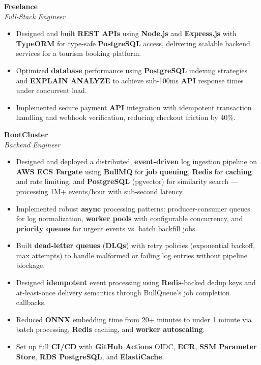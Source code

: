 \documentclass[10pt, a4paper]{article}
\begin{document}
\textbf{Freelance} \\
{\textit{\textcolor{subtle}{Full-Stack Engineer}}}\\\begin{itemize}
\item Designed and built \textbf{REST APIs} using \textbf{Node.js} and \textbf{Express.js} with \textbf{TypeORM} for type-safe \textbf{PostgreSQL} access, delivering scalable backend services for a tourism booking platform.
\item Optimized \textbf{database} performance using \textbf{PostgreSQL} indexing strategies and \textbf{EXPLAIN ANALYZE} to achieve sub-100ms \textbf{API} response times under concurrent load.
\item Implemented secure payment \textbf{API} integration with idempotent transaction handling and webhook verification, reducing checkout friction by 40\%.
\end{itemize}

\textbf{RootCluster} \\
{\textit{\textcolor{subtle}{Backend Engineer}}}\\\begin{itemize}
\item Designed and deployed a distributed, \textbf{event-driven} log ingestion pipeline on \textbf{AWS ECS Fargate} using \textbf{BullMQ} for \textbf{job queuing}, \textbf{Redis} for \textbf{caching} and rate limiting, and \textbf{PostgreSQL} (pgvector) for similarity search — processing 1M+ events/hour with sub-second latency.
\item Implemented robust \textbf{async} processing patterns: producer-consumer queues for log normalization, \textbf{worker pools} with configurable concurrency, and \textbf{priority queues} for urgent events vs. batch backfill jobs.
\item Built \textbf{dead-letter queues} (\textbf{DLQs}) with retry policies (exponential backoff, max attempts) to handle malformed or failing log entries without pipeline blockage.
\item Designed \textbf{idempotent} event processing using \textbf{Redis}-backed dedup keys and at-least-once delivery semantics through BullQueue's job completion callbacks.
\item Reduced \textbf{ONNX} embedding time from 20+ minutes to under 1 minute via batch processing, \textbf{Redis} caching, and \textbf{worker autoscaling}.
\item Set up full \textbf{CI/CD} with \textbf{GitHub Actions} OIDC, \textbf{ECR}, \textbf{SSM Parameter Store}, \textbf{RDS PostgreSQL}, and \textbf{ElastiCache}.
\end{itemize}
\end{document}

